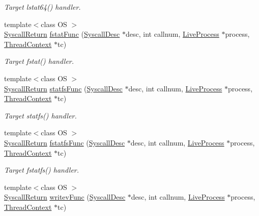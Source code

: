 \begin{DoxyCompactItemize}
\begin{DoxyCompactList}\small\item\em Target lstat64() handler. \item\end{DoxyCompactList}\item 
{\footnotesize template$<$class OS $>$ }\\\hyperlink{classSyscallReturn}{SyscallReturn} \hyperlink{syscall__emul_8hh_a56cd0d550ccc314d5ad3f735436c9d92}{fstatFunc} (\hyperlink{classSyscallDesc}{SyscallDesc} $\ast$desc, int callnum, \hyperlink{classLiveProcess}{LiveProcess} $\ast$process, \hyperlink{classThreadContext}{ThreadContext} $\ast$tc)
\begin{DoxyCompactList}\small\item\em Target fstat() handler. \item\end{DoxyCompactList}\item 
{\footnotesize template$<$class OS $>$ }\\\hyperlink{classSyscallReturn}{SyscallReturn} \hyperlink{syscall__emul_8hh_aeeffeafdf73963270562a90525eeef65}{statfsFunc} (\hyperlink{classSyscallDesc}{SyscallDesc} $\ast$desc, int callnum, \hyperlink{classLiveProcess}{LiveProcess} $\ast$process, \hyperlink{classThreadContext}{ThreadContext} $\ast$tc)
\begin{DoxyCompactList}\small\item\em Target statfs() handler. \item\end{DoxyCompactList}\item 
{\footnotesize template$<$class OS $>$ }\\\hyperlink{classSyscallReturn}{SyscallReturn} \hyperlink{syscall__emul_8hh_a4cc46834712d2de5f76e696ab5d7a275}{fstatfsFunc} (\hyperlink{classSyscallDesc}{SyscallDesc} $\ast$desc, int callnum, \hyperlink{classLiveProcess}{LiveProcess} $\ast$process, \hyperlink{classThreadContext}{ThreadContext} $\ast$tc)
\begin{DoxyCompactList}\small\item\em Target fstatfs() handler. \item\end{DoxyCompactList}\item 
{\footnotesize template$<$class OS $>$ }\\\hyperlink{classSyscallReturn}{SyscallReturn} \hyperlink{syscall__emul_8hh_a5ddafb78a103551d95e66674ad49a104}{writevFunc} (\hyperlink{classSyscallDesc}{SyscallDesc} $\ast$desc, int callnum, \hyperlink{classLiveProcess}{LiveProcess} $\ast$process, \hyperlink{classThreadContext}{ThreadContext} $\ast$tc)

\end{DoxyCompactItemize}
